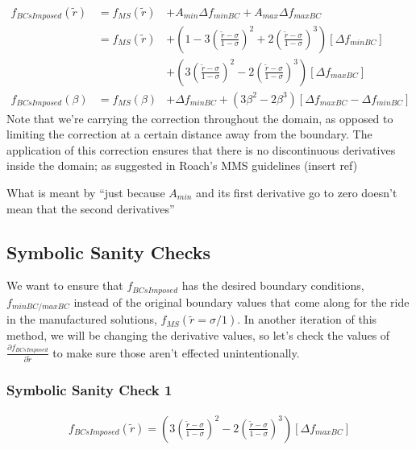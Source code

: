 \documentclass[a4paper]{article}
\begin{document}
\begin{align*}
    f_{BCsImposed} (\widetilde{r}) &= 
    f_{MS}(\widetilde{r}) &+ A_{min} \Delta f_{minBC} + A_{max} \Delta f_{maxBC} \\
                                   &= 
    f_{MS}(\widetilde{r}) &+
    \left(
        1 - 3 \left(  \frac{\widetilde{r} - \sigma }{ 1 - \sigma}\right)^2 +
    2 \left( \frac{\widetilde{r} - \sigma}{1 - \sigma} \right)^3 
\right)
    \left[ \Delta f_{minBC} \right]\\ 
           & &+
    \left(
         3 \left(  \frac{\widetilde{r} - \sigma }{ 1 - \sigma}\right)^2- 
    2 \left( \frac{\widetilde{r} - \sigma}{1 - \sigma} \right)^3 
\right)
    \left[ \Delta f_{maxBC} \right] \\ 
              f_{BCsImposed} (\beta) &= f_{MS}(\beta) &+ \Delta f_{minBC} + \left(  3 \beta^2 - 2 \beta^3  \right)
    \left[  \Delta f_{maxBC} - \Delta f_{minBC} \right]
\end{align*}
Note that we're carrying the correction throughout the domain, as opposed to 
limiting the correction at a certain distance away from the boundary. The 
application of this correction ensures that there is no discontinuous derivatives
inside the domain; as suggested in Roach's MMS guidelines (insert ref) 


What is meant by ``just because $A_{min}$ and its first derivative go to zero
doesn't mean that the second derivatives''


\subsection{Symbolic Sanity Checks}
We want to ensure that $f_{BCsImposed}$ has the desired boundary conditions, 
$f_{minBC/maxBC}$ instead of the original boundary values that come along
for the ride in the manufactured solutions, $f_{MS}(\widetilde{r}=\sigma /1)$. 
In another iteration of this method, we will be changing the derivative values,
so let's check the values of $\frac{\partial f_{BCsImposed}}{\partial \widetilde{r}}$ 
to make sure those aren't effected unintentionally.





\subsubsection*{Symbolic Sanity Check 1}

\begin{align*}
    f_{BCsImposed}(\widetilde{r}) =
    \left(
        3 \left(  \frac{\widetilde{r} - \sigma }{ 1 - \sigma}\right)^2- 
        2 \left( \frac{\widetilde{r} - \sigma}{1 - \sigma} \right)^3 
    \right)
    \left[ \Delta f_{maxBC} \right] 
\end{align*} 
\end{document}
